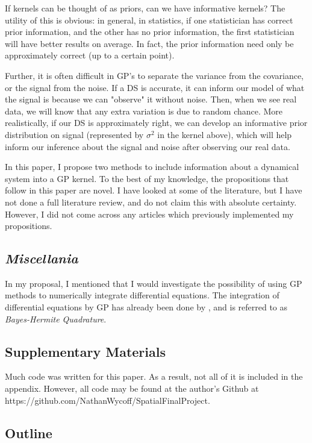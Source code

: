 \documentclass{article}
\begin{document}
	If kernels can be thought of as priors, can we have informative kernels? The utility of this is obvious: in general, in statistics, if one statistician has correct prior information, and the other has no prior information, the first statistician will have better results on average. In fact, the prior information need only be approximately correct (up to a certain point). 
	
	Further, it is often difficult in GP's to separate the variance from the covariance, or the signal from the noise. If a DS is accurate, it can inform our model of what the signal is because we can "observe" it without noise. Then, when we see real data, we will know that any extra variation is due to random chance. More realistically, if our DS is approximately right, we can develop an informative prior distribution on signal (represented by $\sigma^2$ in the kernel above), which will help inform our inference about the signal and noise after observing our real data.
	
	In this paper, I propose two methods to include information about a dynamical system into a GP kernel. To the best of my knowledge, the propositions that follow in this paper are novel. I have looked at some of the literature, but I have not done a full literature review, and do not claim this with absolute certainty. However, I did not come across any articles which previously implemented my propositions.
	
	\subsection{\textit{Miscellania}}
	
	In my proposal, I mentioned that I would investigate the possibility of using GP methods to numerically integrate differential equations. The integration of differential equations by GP has already been done by \cite{OHAGAN1991245}, and is referred to as \textit{Bayes-Hermite Quadrature}.
	
	\subsection{Supplementary Materials}
	
	Much code was written for this paper. As a result, not all of it is included in the appendix. However, all code may be found at the author's Github at https://github.com/NathanWycoff/SpatialFinalProject.
	
	\subsection{Outline}
	
\end{document}
